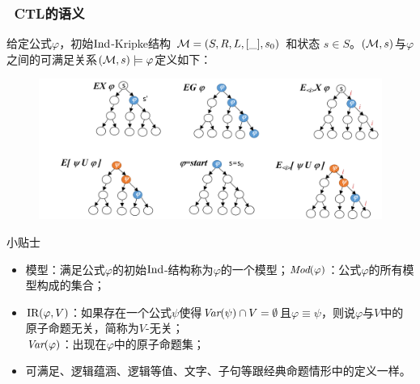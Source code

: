 \documentclass[aspectratio=1610, 9pt, CJK]{beamer}
\begin{document}
\begin{frame} 
	\frametitle{~CTL的语义}
	{\footnotesize  
		\begin{definition}[带索引的CTL的语义]\label{def:ctl:semantic}
			给定公式$\varphi$，初始$\textrm{Ind}$-Kripke结构 ${\cal M}=(S,R,L,[\_],s_0)$ 和状态 $s\in S$。$({\cal M},s)$与$\varphi$之间的可满足关系$({\cal M},s)\models \varphi$定义如下：
			\begin{figure}
				\includegraphics[scale=0.3]{figures/semanticCTL}
			\end{figure}
		\end{definition}%
		\begin{block}{{\footnotesize 小贴士}}
			\tiny{
				\begin{itemize}
					\item \textcolor{blue!80}{模型}：满足公式$\varphi$的初始$\textrm{Ind}$-结构称为$\varphi$的一个模型；\qquad $\textit{Mod}(\varphi)$：公式$\varphi$的所有模型构成的集合； 
					\item \textcolor{blue!80}{$\textrm{IR}(\varphi,V)$}：如果存在一个公式$\psi$使得$\textit{Var}(\psi) \cap V = \emptyset$且$\varphi \equiv \psi$，则说$\varphi$与$V$中的原子命题\textcolor{blue!80}{无关}，简称为\textcolor{blue!80}{$V$-无关}；\\ $\textit{Var}(\varphi)$：出现在$\varphi$中的原子命题集；
					\item 可满足、逻辑蕴涵、逻辑等值、文字、子句等跟经典命题情形中的定义一样。
				\end{itemize}
			}
		\end{block} 
	}
\end{frame}
\end{document}
